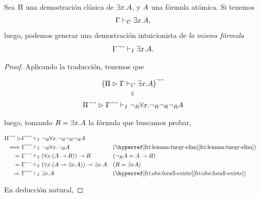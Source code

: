 \begin{theorem}
    \label{fri:thm:fri-sigmaone}

    Sea $\Pi$ una demostración clásica de $\exists x . A$, y
    $A$ una fórmula atómica.
    Si tenemos
    \[
        \Gamma \vdash_C \exists x . A,
    \]
    luego, podemos generar una demostración intuicionista de \textit{la misma fórmula}
    \[
        \Gamma^{\neg\neg} \vdash_I \exists x . A.
    \]
\end{theorem}
\begin{proof}

Aplicando la traducción, tenemos que

\begin{gather*}
    \transDNeg{\big(
        \someProof \proves \ctx \judgC \exists \var . \form
    \big)}\\
    \verteq\\
    \transDNeg{\someProof} \proves \transDNeg{\ctx} \judgI \fNotR \forall \var . \fNotR \fNotR \fNotR \form
\end{gather*}

luego, tomando $R = \exists x . A$ la fórmula que buscamos probar,

\begin{align*}
    \transDNeg{\someProof} \proves & \transDNeg{\ctx} \judgI \fNotR \forall \var . \fNotR \fNotR \fNotR \form\\
    \iff & \transDNeg{\ctx} \judgI \fNotR \forall \var . \fNotR \form
        &&(\text{\namedref{fri:lemma:tnegr-elim}})\\
    =\ &\transDNeg{\ctx} \judgI (\forall \var . (\form \rightarrow R)) \rightarrow R
        &&(\fNotR \form = \form \fImp R)\\
    =\ &\transDNeg{\ctx} \judgI (\forall \var . (\form \rightarrow \exists \var . \form)) \rightarrow \exists \var . \form && (R = \exists \var \form)\\
    \Rightarrow\ &\transDNeg{\ctx} \judgI \exists \var . \form
        && (\text{\namedref{fri:obs:forall-exists}})
\end{align*}

En deducción natural,


\end{proof}

